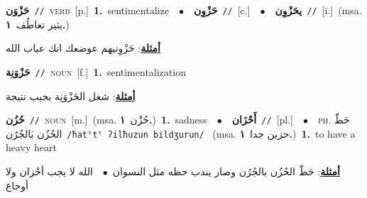 \documentclass[10pt,a4paper,twoside]{article} %
\begin{document}
\begin{multicols}{2}
{\setlength\topsep{0pt}\textbf{\foreignlanguage{arabic}{حَزْوَن}}\ {\color{gray}\texttt{//}\color{black}}\ \textsc{verb}\ [p.]\ \textbf{1.}~sentimentalize\ \ $\bullet$\ \ \setlength\topsep{0pt}\textbf{\foreignlanguage{arabic}{حَزْوِن}}\ {\color{gray}\texttt{//}\color{black}}\ [c.]\ \ $\bullet$\ \ \setlength\topsep{0pt}\textbf{\foreignlanguage{arabic}{يحَزْوِن}}\ {\color{gray}\texttt{//}\color{black}}\ [i.]\ \color{gray}(msa. \foreignlanguage{arabic}{يثير تعاطُف}~\foreignlanguage{arabic}{\textbf{١.}})\color{black}\  \begin{flushright}\color{gray}\foreignlanguage{arabic}{\textbf{\underline{\foreignlanguage{arabic}{أمثلة}}}: حَزْوِنيهم عوضعك انك عباب الله}\end{flushright}\color{black}} \vspace{2mm}

{\setlength\topsep{0pt}\textbf{\foreignlanguage{arabic}{حَزْوَنِة}}\ {\color{gray}\texttt{//}\color{black}}\ \textsc{noun}\ [f.]\ \textbf{1.}~sentimentalization\  \begin{flushright}\color{gray}\foreignlanguage{arabic}{\textbf{\underline{\foreignlanguage{arabic}{أمثلة}}}: شغل الحَزْوَنِة بجيب نتيجة}\end{flushright}\color{black}} \vspace{2mm}

{\setlength\topsep{0pt}\textbf{\foreignlanguage{arabic}{حُزُن}}\ {\color{gray}\texttt{//}\color{black}}\ \textsc{noun}\ [m.]\ \color{gray}(msa. \foreignlanguage{arabic}{حُزْن}~\foreignlanguage{arabic}{\textbf{١.}})\color{black}\ \textbf{1.}~sadness\ \ $\bullet$\ \ \setlength\topsep{0pt}\textbf{\foreignlanguage{arabic}{أَحْزَان}}\ {\color{gray}\texttt{//}\color{black}}\ [pl.]\ \ $\bullet$\ \ \textsc{ph.} \color{gray} \foreignlanguage{arabic}{حَطّ الحُزُن بَالجُرُن}\color{black}\ {\color{gray}\texttt{/{\sffamily ħatˤtˤ ʔilħuzun bildʒurun}/}\color{black}}\ \color{gray} (msa. \foreignlanguage{arabic}{حزين جدا}~\foreignlanguage{arabic}{\textbf{١.}})\color{black}\ \textbf{1.}~to have a heavy heart\  \begin{flushright}\color{gray}\foreignlanguage{arabic}{\textbf{\underline{\foreignlanguage{arabic}{أمثلة}}}: حَطّ الحُزُن بالجُرُن وصار يندب حظه مثل النسوان\ $\bullet$\ \  الله لا يجب أحْزان ولا أوجاع}\end{flushright}\color{black}} \vspace{2mm}


\end{multicols}
\end{document}
